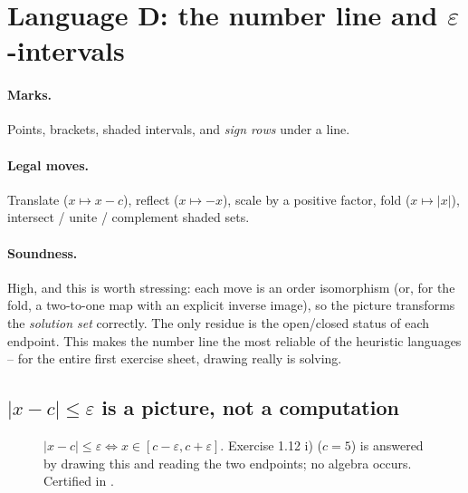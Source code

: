\section{Language D: the number line and $\varepsilon$-intervals}
\label{sec:numberline}

\paragraph{Marks.} Points, brackets, shaded intervals, and \emph{sign rows} under a line.
\paragraph{Legal moves.} Translate ($x\mapsto x-c$), reflect ($x\mapsto-x$), scale by a
positive factor, fold ($x\mapsto|x|$), intersect / unite / complement shaded sets.
\paragraph{Soundness.} High, and this is worth stressing: each move is an order
isomorphism (or, for the fold, a two-to-one map with an explicit inverse image), so the
picture transforms the \emph{solution set} correctly. The only residue is the open/closed
status of each endpoint. This makes the number line the most reliable of the heuristic
languages -- for the entire first exercise sheet, drawing really is solving.

\subsection{$|x-c|\le\varepsilon$ is a picture, not a computation}

\begin{figure}[H]
\centering
{}
\caption{$|x-c|\le\varepsilon\iff x\in[c-\varepsilon,c+\varepsilon]$. Exercise 1.12 i)
($c=5$) is answered by drawing this and reading the two endpoints; no algebra occurs.
Certified in .}
\label{fig:epsint}
\end{figure}


